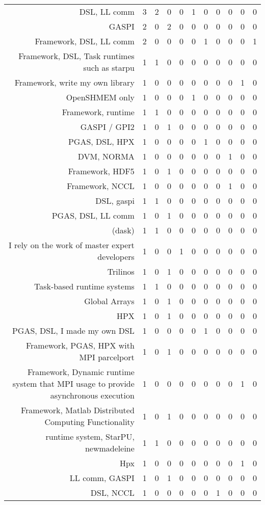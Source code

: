 {\begin{landscape}
\begin{longtable}[htb]{r|c|c|c|c|c|c|c|c|c|c}
{DSL, LL comm} & 3 & 2 & 0 & 0 & 1 & 0 & 0 & 0 & 0 & 0 \\%
{GASPI} & 2 & 0 & 2 & 0 & 0 & 0 & 0 & 0 & 0 & 0 \\%
{Framework, DSL, LL comm} & 2 & 0 & 0 & 0 & 0 & 1 & 0 & 0 & 0 & 1 \\%
{Framework, DSL, Task runtimes such as starpu} & 1 & 1 & 0 & 0 & 0 & 0 & 0 & 0 & 0 & 0 \\%
{Framework, write my own library} & 1 & 0 & 0 & 0 & 0 & 0 & 0 & 0 & 1 & 0 \\%
{OpenSHMEM only} & 1 & 0 & 0 & 0 & 1 & 0 & 0 & 0 & 0 & 0 \\%
{Framework, runtime} & 1 & 1 & 0 & 0 & 0 & 0 & 0 & 0 & 0 & 0 \\%
{GASPI / GPI2} & 1 & 0 & 1 & 0 & 0 & 0 & 0 & 0 & 0 & 0 \\%
{PGAS, DSL, HPX} & 1 & 0 & 0 & 0 & 0 & 1 & 0 & 0 & 0 & 0 \\%
{DVM, NORMA} & 1 & 0 & 0 & 0 & 0 & 0 & 0 & 1 & 0 & 0 \\%
{Framework, HDF5} & 1 & 0 & 1 & 0 & 0 & 0 & 0 & 0 & 0 & 0 \\%
{Framework, NCCL} & 1 & 0 & 0 & 0 & 0 & 0 & 0 & 1 & 0 & 0 \\%
{DSL, gaspi} & 1 & 1 & 0 & 0 & 0 & 0 & 0 & 0 & 0 & 0 \\%
{PGAS, DSL, LL comm} & 1 & 0 & 1 & 0 & 0 & 0 & 0 & 0 & 0 & 0 \\%
{(dask)} & 1 & 1 & 0 & 0 & 0 & 0 & 0 & 0 & 0 & 0 \\%
{I rely on the work of master expert developers} & 1 & 0 & 0 & 1 & 0 & 0 & 0 & 0 & 0 & 0 \\%
{Trilinos} & 1 & 0 & 1 & 0 & 0 & 0 & 0 & 0 & 0 & 0 \\%
{Task-based runtime systems} & 1 & 1 & 0 & 0 & 0 & 0 & 0 & 0 & 0 & 0 \\%
{Global Arrays} & 1 & 0 & 1 & 0 & 0 & 0 & 0 & 0 & 0 & 0 \\%
{HPX} & 1 & 0 & 1 & 0 & 0 & 0 & 0 & 0 & 0 & 0 \\%
{PGAS, DSL, I made my own DSL} & 1 & 0 & 0 & 0 & 0 & 1 & 0 & 0 & 0 & 0 \\%
{Framework, PGAS, HPX with MPI parcelport} & 1 & 0 & 1 & 0 & 0 & 0 & 0 & 0 & 0 & 0 \\%
{Framework, Dynamic runtime system that MPI usage to provide asynchronous execution} & 1 & 0 & 0 & 0 & 0 & 0 & 0 & 0 & 1 & 0 \\%
{Framework, Matlab Distributed Computing Functionality} & 1 & 0 & 1 & 0 & 0 & 0 & 0 & 0 & 0 & 0 \\%
{runtime system, StarPU, newmadeleine} & 1 & 1 & 0 & 0 & 0 & 0 & 0 & 0 & 0 & 0 \\%
{Hpx} & 1 & 0 & 0 & 0 & 0 & 0 & 0 & 0 & 1 & 0 \\%
{LL comm, GASPI} & 1 & 0 & 1 & 0 & 0 & 0 & 0 & 0 & 0 & 0 \\%
{DSL, NCCL} & 1 & 0 & 0 & 0 & 0 & 0 & 1 & 0 & 0 & 0 \\%
\hline%
\end{longtable}%
\end{landscape}}%
\clearpage%
